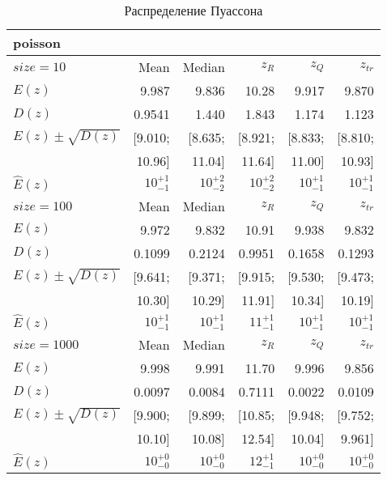 \begin{table}[H]
    \centering
    \begin{tabular}[t]{|l|r|r|r|r|r|}
        \hline
        poisson & & & & & \\
        \hline
        \hline
        $size=10$   &      Mean &    Median &       $z_R$ &      $z_Q$ &      $z_{tr}$ \\
        \hline
        $E(z)$ & 9.987 & 9.836 & 10.28 & 9.917 & 9.870 \\
        \hline
        $D(z)$ & 0.9541 & 1.440 & 1.843 & 1.174 & 1.123 \\
        \hline
        $E(z) \pm \sqrt{D(z)}$ & [9.010; & [8.635; & [8.921; & [8.833; & [8.810; \\
          & 10.96] & 11.04] & 11.64] & 11.00] & 10.93] \\
        \hline
        $\widehat{E}(z)$ & ${10}^{+1}_{-1}$ & ${10}^{+2}_{-2}$ & ${10}^{+2}_{-2}$ & ${10}^{+1}_{-1}$ & ${10}^{+1}_{-1}$\\
        \hline
        \hline
        $size=100$   &      Mean &    Median &       $z_R$ &      $z_Q$ &      $z_{tr}$ \\
        \hline
        $E(z)$ & 9.972 & 9.832 & 10.91 & 9.938 & 9.832 \\
        \hline
        $D(z)$ & 0.1099 & 0.2124 & 0.9951 & 0.1658 & 0.1293 \\
        \hline
        $E(z) \pm \sqrt{D(z)}$ & [9.641; & [9.371; & [9.915; & [9.530; & [9.473; \\
          & 10.30] & 10.29] & 11.91] & 10.34] & 10.19] \\
        \hline
        $\widehat{E}(z)$ & ${10}^{+1}_{-1}$ & ${10}^{+1}_{-1}$ & ${11}^{+1}_{-1}$ & ${10}^{+1}_{-1}$ & ${10}^{+1}_{-1}$\\
        \hline
        \hline
        $size=1000$   &      Mean &    Median &       $z_R$ &      $z_Q$ &      $z_{tr}$ \\
        \hline
        $E(z)$ & 9.998 & 9.991 & 11.70 & 9.996 & 9.856 \\
        \hline
        $D(z)$ & 0.0097 & 0.0084 & 0.7111 & 0.0022 & 0.0109 \\
        \hline
        $E(z) \pm \sqrt{D(z)}$ & [9.900; & [9.899; & [10.85; & [9.948; & [9.752; \\
          & 10.10] & 10.08] & 12.54] & 10.04] & 9.961] \\
        \hline
        $\widehat{E}(z)$ & ${10}^{+0}_{-0}$ & ${10}^{+0}_{-0}$ & ${12}^{+1}_{-1}$ & ${10}^{+0}_{-0}$ & ${10}^{+0}_{-0}$\\
        \hline
    \end{tabular}
    \caption{Распределение Пуассона}
    \label{tab:poisson}
\end{table}


